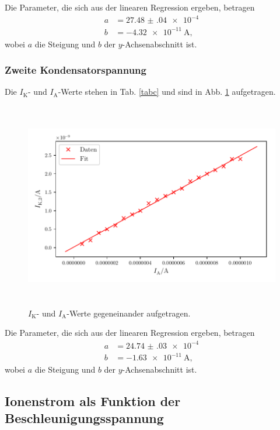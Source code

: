 \noindent Die Parameter, die sich aus der linearen Regression ergeben, betragen
\begin{align*}
    a &= \num{27.48(04)e-4}\\
    b &= \SI{-4.32e-11}{\ampere},
\end{align*}
wobei $a$ die Steigung und $b$ der $y$-Achsenabschnitt ist. 

\subsubsection{Zweite Kondensatorspannung}
Die $I_\text{K}$- und $I_\text{A}$-Werte stehen in Tab. \ref{tabc} und sind in Abb. \ref{fig:plot2} aufgetragen. 

\begin{figure}
    \centering
    \includegraphics[width=15cm, height=9cm]{build/plot2.pdf}
    \caption{$I_\text{K}$- und $I_\text{A}$-Werte gegeneinander aufgetragen.}
    \label{fig:plot2}
\end{figure}

\noindent Die Parameter, die sich aus der linearen Regression ergeben, betragen
\begin{align*}
    a &= \num{24.74(03)e-4}\\
    b &= \SI{-1.63e-11}{\ampere},
\end{align*}
wobei $a$ die Steigung und $b$ der $y$-Achsenabschnitt ist. 



\subsection{Ionenstrom als Funktion der Beschleunigungsspannung}

